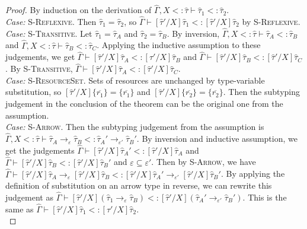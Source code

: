 \documentclass{llncs}
\begin{document}
\begin{proof} By induction on the derivation of $\hat \Gamma, X <: \hat \tau \vdash \hat \tau_1 <: \hat \tau_2$.\\

\textit{Case:} \textsc{S-Reflexive}. Then $\hat \tau_1 = \hat \tau_2$, so $\hat \Gamma \vdash [\hat \tau'/X]\hat \tau_1 <: [\hat \tau'/X]\hat \tau_2$ by \textsc{S-Reflexive}. \\

\textit{Case:} \textsc{S-Transitive}. Let $\hat \tau_1 = \hat \tau_A$ and $\hat \tau_2 = \hat \tau_B$. By inversion, $\hat \Gamma, X <: \hat \tau \vdash \hat \tau_A <: \hat \tau_B$ and $\hat \Gamma, X <: \hat \tau \vdash \hat \tau_B <: \hat \tau_C$. Applying the inductive assumption to these judgements, we get $\hat \Gamma \vdash [\hat \tau'/X]\hat \tau_A <: [\hat \tau'/X]\hat \tau_B$ and $\hat \Gamma \vdash [\hat \tau'/X]\hat \tau_B <: [\hat \tau'/X]\hat \tau_C$. By \textsc{S-Transitive}, $\hat \Gamma \vdash [\hat \tau'/X]\hat \tau_A <: [\hat \tau'/X]\hat \tau_C$.\\

\textit{Case:} \textsc{S-ResourceSet}. Sets of resources are unchanged by type-variable substitution, so $[\hat \tau'/X]\{ \overline{r_1} \} = \{ \overline{r_1} \}$ and $[\hat \tau'/X]\{ \overline{r_2} \} = \{ \overline{r_2} \}$. Then the subtyping judgement in the conclusion of the theorem can be the original one from the assumption. \\

\textit{Case:} \textsc{S-Arrow}. Then the subtyping judgement from the assumption is $\hat \Gamma, X <: \hat \tau \vdash \hat \tau_A \rightarrow_{\varepsilon} \hat \tau_B <: \hat \tau_A' \rightarrow_{\varepsilon'} \hat \tau_B'$. By inversion and inductive assumption, we get the judgements $\hat \Gamma \vdash [\hat \tau'/X]\hat \tau_A' <: [\hat \tau'/X]\hat \tau_A$ and $\hat \Gamma \vdash [\hat \tau'/X]\hat \tau_B <: [\hat \tau'/X]\hat \tau_B'$ and $\varepsilon \subseteq \varepsilon'$. Then by \textsc{S-Arrow}, we have $\hat \Gamma \vdash [\hat \tau'/X]\hat \tau_A \rightarrow_{\varepsilon} [\hat \tau'/X]\hat \tau_B <: [\hat \tau'/X]\hat \tau_A' \rightarrow_{\varepsilon'} [\hat \tau'/X]\hat \tau_B'$. By applying the definition of substitution on an arrow type in reverse, we can rewrite this judgement as $\hat \Gamma \vdash [\hat \tau'/X](\hat \tau_1 \rightarrow_{\varepsilon} \hat \tau_B) <: [\hat \tau'/X](\hat \tau_A' \rightarrow_{\varepsilon'} \hat \tau_B')$. This is the same as $\hat \Gamma \vdash [\hat \tau'/X]\hat \tau_1 <: [\hat \tau'/X]\hat \tau_2$. \\


\end{proof}
\end{document}
